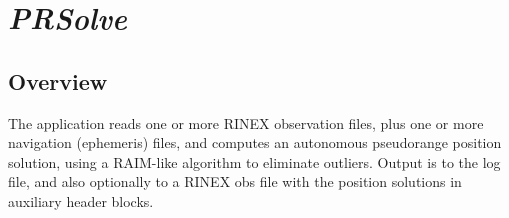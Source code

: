 %
%

\section{\emph{PRSolve}}
\subsection{Overview}
The application reads one or more RINEX observation files, plus one or more
   navigation (ephemeris) files, and computes an autonomous pseudorange
   position solution, using a RAIM-like algorithm to eliminate outliers.
   Output is to the log file, and also optionally to a RINEX obs file with
   the position solutions in auxiliary header blocks.


